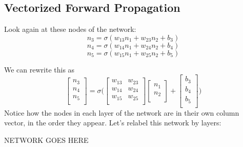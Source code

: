 \documentclass{article}
\begin{document}
\subsection{Vectorized Forward Propagation}

Look again at these nodes of the network:
\[n_3 = \sigma(w_{13}n_1 + w_{23}n_2 + b_3)\]
\[n_4 = \sigma(w_{14}n_1 + w_{24}n_2 + b_4)\]
\[n_5 = \sigma(w_{15}n_1 + w_{25}n_2 + b_5)\]

We can rewrite this as
\[
\begin{bmatrix}
    n_{3}\\
    n_{4}\\
    n_{5}\\
\end{bmatrix}
=
\sigma
\Bigg(
\begin{bmatrix}
    w_{13}       & w_{23}\\
    w_{14}       & w_{24}\\
    w_{15}       & w_{25}\\
\end{bmatrix}
\begin{bmatrix}
    n_{1}\\
    n_{2}\\
\end{bmatrix}
+
\begin{bmatrix}
    b_{3}\\
    b_{4}\\
    b_{5}\\
\end{bmatrix}
\Bigg)
\]
Notice how the nodes in each layer of the network are in their own column vector, in the order they appear.
Let's relabel this network by layers:

NETWORK GOES HERE
\end{document}
